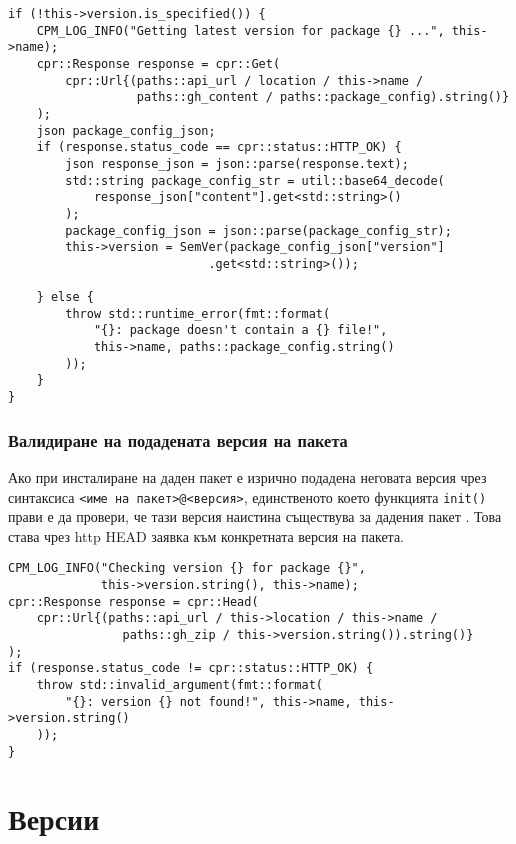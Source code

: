 \begin{lstlisting}[style=cpp,
				   caption=Сдобиване с последната версия на пакета,
				   label={lst:init-latest}]
if (!this->version.is_specified()) {
	CPM_LOG_INFO("Getting latest version for package {} ...", this->name);
	cpr::Response response = cpr::Get(
		cpr::Url{(paths::api_url / location / this->name /
				  paths::gh_content / paths::package_config).string()}
	);
	json package_config_json;
	if (response.status_code == cpr::status::HTTP_OK) {
		json response_json = json::parse(response.text);
		std::string package_config_str = util::base64_decode(
			response_json["content"].get<std::string>()
		);
		package_config_json = json::parse(package_config_str);
		this->version = SemVer(package_config_json["version"]
							.get<std::string>());

	} else {
		throw std::runtime_error(fmt::format(
			"{}: package doesn't contain a {} file!",
			this->name, paths::package_config.string()
		));
	}
}
\end{lstlisting}


\subsubsection{Валидиране на подадената версия на пакета}

Ако при инсталиране на даден пакет е изрично подадена неговата версия чрез
синтаксиса \texttt{<име на пакет>@<версия>}, единственото което функцията
\texttt{init()} прави е да провери, че тази версия наистина съществува за
дадения пакет . Това става чрез \acrshort{http} HEAD
заявка към конкретната версия на пакета.

\begin{lstlisting}[style=cpp,
				   caption=Валидиране на подадената версия на пакета,
				   label=lst:init-validate]
CPM_LOG_INFO("Checking version {} for package {}",
			 this->version.string(), this->name);
cpr::Response response = cpr::Head(
	cpr::Url{(paths::api_url / this->location / this->name /
				paths::gh_zip / this->version.string()).string()}
);
if (response.status_code != cpr::status::HTTP_OK) {
	throw std::invalid_argument(fmt::format(
		"{}: version {} not found!", this->name, this->version.string()
	));
}
\end{lstlisting}


\section{Версии}

